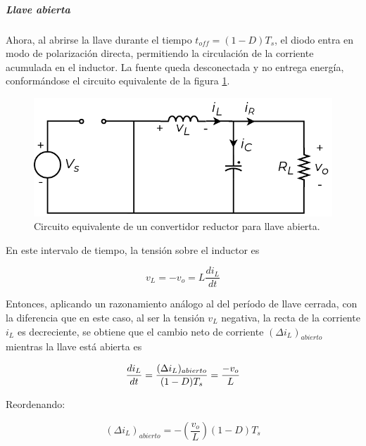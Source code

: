 \subparagraph{Llave abierta}

Ahora, al abrirse la llave durante el tiempo $t_{off} = (1-D)T_s$, el diodo entra en modo de polarización directa, permitiendo la circulación de la corriente acumulada en el inductor. La fuente queda desconectada y no entrega energía, conformándose el circuito equivalente de la figura \ref{reductor_llave_abierta}.\\

\begin{figure}[h]
    \centering
    \includegraphics[scale=0.6]{Imagenes/Reductor Llave Abierta.pdf}
    \caption{Circuito equivalente de un convertidor reductor para llave abierta.}
    \label{reductor_llave_abierta}
\end{figure}

En este intervalo de tiempo, la tensión sobre el inductor es

\begin{equation}\label{ec_tensionL_abierta}
    v_L = -v_o = L\frac{di_L}{dt}
\end{equation}

Entonces, aplicando un razonamiento análogo al del período de llave cerrada, con la diferencia que en este caso, al ser la tensión $v_L$ negativa, la recta de la corriente $i_L$ es decreciente, se obtiene que el cambio neto de corriente $(\Delta i_L)_{abierto}$ mientras la llave está abierta es

\begin{equation*}
    \frac{di_L}{dt} = \frac{(\Delta i_L)_{abierto}}{(1-D)T_s} = \frac{-v_o}{L}\\
\end{equation*}

Reordenando:

\begin{equation}\label{deltaiL_abierta}
    \boxed{
        (\Delta i_L)_{abierto} = -\left(\frac{v_o}{L}\right)(1-D)T_s
    }
\end{equation}

